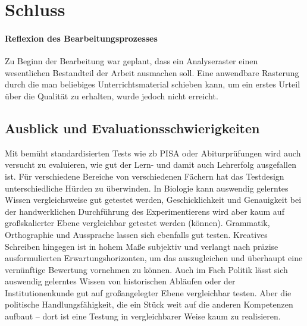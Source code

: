 

\section{Schluss}

\paragraph{Reflexion des Bearbeitungsprozesses}
Zu Beginn der Bearbeitung war geplant, dass ein Analyseraster einen wesentlichen Bestandteil der Arbeit ausmachen soll. 
Eine anwendbare Rasterung durch die man beliebiges Unterrichtsmaterial schieben kann, um ein erstes Urteil über die Qualität zu erhalten, wurde jedoch nicht erreicht. 


\subsection{Ausblick und Evaluationsschwierigkeiten}
Mit bemüht standardisierten Tests wie \gls{zb} PISA oder Abiturprüfungen wird auch versucht zu evaluieren, wie gut der Lern- und damit auch Lehrerfolg ausgefallen ist. Für verschiedene Bereiche von verschiedenen Fächern hat das Testdesign unterschiedliche Hürden zu überwinden. 
In Biologie kann auswendig gelerntes Wissen vergleichsweise gut getestet werden, Geschicklichkeit und Genauigkeit bei der handwerklichen Durchführung des Experimentierens wird aber kaum auf großskalierter Ebene vergleichbar getestet werden (können).
Grammatik, Orthographie und Aussprache lassen sich ebenfalls gut testen. Kreatives Schreiben hingegen ist in hohem Maße subjektiv und verlangt nach präzise ausformulierten Erwartungshorizonten, um das auszugleichen und überhaupt eine vernünftige Bewertung vornehmen zu können. 
Auch im Fach Politik lässt sich auswendig gelerntes Wissen von historischen Abläufen oder der Institutionenkunde gut auf großangelegter Ebene vergleichbar testen. Aber die politische Handlungsfähigkeit, die ein Stück weit auf die anderen Kompetenzen aufbaut -- dort ist eine Testung in vergleichbarer Weise kaum zu realisieren. 

